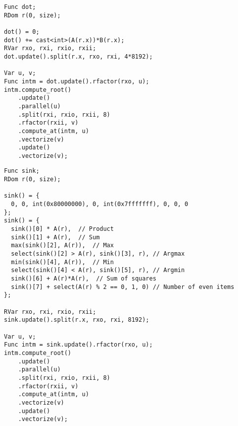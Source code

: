 \begin{lstlisting}[caption={Benchmark code for dot product}, label={lst:benchmark_dot_product}]
Func dot;
RDom r(0, size);

dot() = 0;
dot() += cast<int>(A(r.x))*B(r.x);
RVar rxo, rxi, rxio, rxii;
dot.update().split(r.x, rxo, rxi, 4*8192);

Var u, v;
Func intm = dot.update().rfactor(rxo, u);
intm.compute_root()
    .update()
    .parallel(u)
    .split(rxi, rxio, rxii, 8)
    .rfactor(rxii, v)
    .compute_at(intm, u)
    .vectorize(v)
    .update()
    .vectorize(v);
\end{lstlisting}

\begin{lstlisting}[caption={Benchmark code for kitchen sink.}, label={lst:benchmark_kitchen_sink}]
Func sink;
RDom r(0, size);

sink() = {
  0, 0, int(0x80000000), 0, int(0x7fffffff), 0, 0, 0
};
sink() = {
  sink()[0] * A(r),  // Product
  sink()[1] + A(r),  // Sum
  max(sink()[2], A(r)),  // Max
  select(sink()[2] > A(r), sink()[3], r), // Argmax
  min(sink()[4], A(r)),  // Min
  select(sink()[4] < A(r), sink()[5], r), // Argmin
  sink()[6] + A(r)*A(r),  // Sum of squares
  sink()[7] + select(A(r) % 2 == 0, 1, 0) // Number of even items
};

RVar rxo, rxi, rxio, rxii;
sink.update().split(r.x, rxo, rxi, 8192);

Var u, v;
Func intm = sink.update().rfactor(rxo, u);
intm.compute_root()
    .update()
    .parallel(u)
    .split(rxi, rxio, rxii, 8)
    .rfactor(rxii, v)
    .compute_at(intm, u)
    .vectorize(v)
    .update()
    .vectorize(v);
\end{lstlisting}
